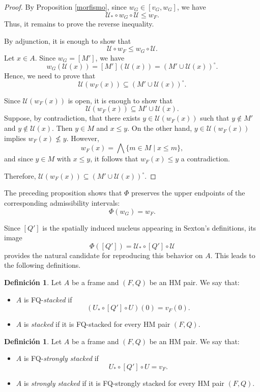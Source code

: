 \documentclass[11pt]{amsart}
\theoremstyle{plain}
\theoremstyle{definition}
\newtheorem{dfn}[thm]{Definición}
\begin{document}
\begin{proof}
By Proposition \ref{morfismo}, since $w_G\in[v_G,w_G]$, we have
\[
\mathcal{U}_*\circ w_G\circ \mathcal{U}\leq w_F.
\]
Thus, it remains to prove the reverse inequality.

By adjunction, it is enough to show that
\[
\mathcal{U}\circ w_F\leq w_G\circ \mathcal{U}.
\]
Let $x\in A$. Since $w_G=[M']$, we have
\[
w_G(\mathcal{U}(x))
=[M'](\mathcal{U}(x))
=(M'\cup \mathcal{U}(x))^\circ.
\]
Hence, we need to prove that
\[
\mathcal{U}(w_F(x))\subseteq (M'\cup \mathcal{U}(x))^\circ.
\]

Since $\mathcal{U}(w_F(x))$ is open, it is enough to show that
\[
\mathcal{U}(w_F(x))\subseteq M'\cup \mathcal{U}(x).
\]
Suppose, by contradiction, that there exists \(y\in \mathcal{U}(w_F(x))\) such that \(y\notin M'\)
and \(y\notin \mathcal{U}(x)\). Then $y\in M$ and $x\leq y$. On the other hand, \(y\in \mathcal{U}(w_F(x))\)
implies \(w_F(x)\nleq y\). However,
\[
w_F(x)=\bigwedge\{m\in M\mid x\leq m\},
\]
and since $y\in M$ with $x\leq y$, it follows that \(w_F(x)\leq y\) a contradiction.

Therefore, \(\mathcal{U}(w_F(x))\subseteq (M'\cup \mathcal{U}(x))^\circ\).
\end{proof}

The preceding proposition shows that \(\Phi\) preserves the upper endpoints of the corresponding admissibility intervals:
\[
\Phi(w_G)=w_F.
\]

Since \([Q']\) is the spatially induced nucleus appearing in Sexton's definitions, its image
\[
\Phi([Q'])=\mathcal U_*\circ[Q']\circ\mathcal U
\]
provides the natural candidate for reproducing this behavior on \(A\). This leads to the following definitions.

\begin{dfn}\label{def:apilado-marcos}
Let $A$ be a frame and $(F,Q)$ be an HM pair. We say that:
\begin{itemize}
    \item $A$ is FQ-\emph{stacked} if
    \[
    (U_*\circ[Q']\circ U)(0)=v_F(0).
    \]
    \item $A$ is \emph{stacked} if it is FQ-stacked for every HM pair $(F,Q)$.
\end{itemize}
\end{dfn}

\begin{dfn}\label{def:fapilado-marcos}
Let $A$ be a frame and $(F,Q)$ be an HM pair. We say that:
\begin{itemize}
    \item $A$ is FQ-\emph{strongly stacked} if
    \[
    U_*\circ[Q']\circ U=v_F.
    \]
    \item $A$ is \emph{strongly stacked} if it is FQ-strongly stacked for every HM pair $(F,Q)$.
\end{itemize}
\end{dfn}
\end{document}
